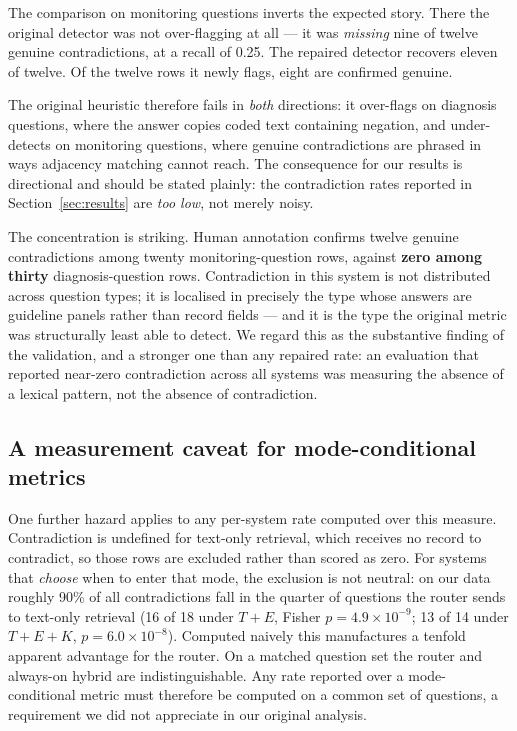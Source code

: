 The comparison on monitoring questions inverts the expected story. There the
original detector was not over-flagging at all --- it was \emph{missing} nine of
twelve genuine contradictions, at a recall of 0.25. The repaired detector
recovers eleven of twelve. Of the twelve rows it newly flags, eight are
confirmed genuine.

The original heuristic therefore fails in \emph{both} directions: it
over-flags on diagnosis questions, where the answer copies coded text
containing negation, and under-detects on monitoring questions, where genuine
contradictions are phrased in ways adjacency matching cannot reach. The
consequence for our results is directional and should be stated plainly: the
contradiction rates reported in Section~\ref{sec:results} are \emph{too low},
not merely noisy.

The concentration is striking. Human annotation confirms twelve genuine
contradictions among twenty monitoring-question rows, against \textbf{zero
among thirty} diagnosis-question rows. Contradiction in this system is not
distributed across question types; it is localised in precisely the type whose
answers are guideline panels rather than record fields --- and it is the type
the original metric was structurally least able to detect. We regard this as
the substantive finding of the validation, and a stronger one than any repaired
rate: an evaluation that reported near-zero contradiction across all systems was
measuring the absence of a lexical pattern, not the absence of contradiction.

\subsection{A measurement caveat for mode-conditional metrics}

One further hazard applies to any per-system rate computed over this measure.
Contradiction is undefined for text-only retrieval, which receives no record to
contradict, so those rows are excluded rather than scored as zero. For systems
that \emph{choose} when to enter that mode, the exclusion is not neutral: on
our data roughly 90\% of all contradictions fall in the quarter of questions
the router sends to text-only retrieval (16 of 18 under $T{+}E$, Fisher
$p = 4.9\times10^{-9}$; 13 of 14 under $T{+}E{+}K$, $p = 6.0\times10^{-8}$).
Computed naively this manufactures a tenfold apparent advantage for the router.
On a matched question set the router and always-on hybrid are indistinguishable.
Any rate reported over a mode-conditional metric must therefore be computed on
a common set of questions, a requirement we did not appreciate in our original
analysis.

